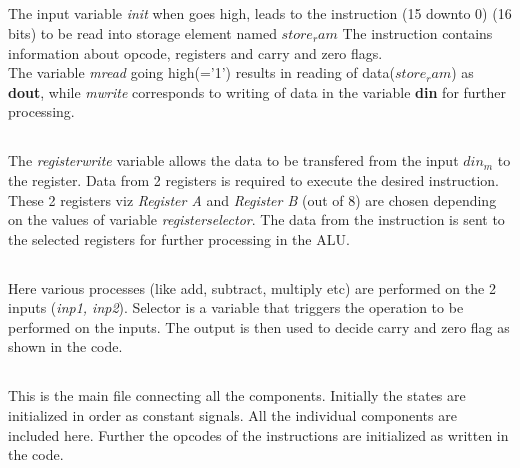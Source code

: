 \documentclass[10pt]{article}
\begin{document}
\subsection{\textbf{\color{blue}{Memory/RAM}}}
The input variable \textit{init} when goes high, leads to the instruction (15 downto 0) (16 bits) to be read into storage element named $ store_ram $
The instruction contains information about opcode, registers and carry and zero flags.
\\ The variable \textit{mread} going high(='1') results in reading of data($ store_ram $) as \textbf{dout}, while \textit{mwrite} corresponds to writing of data in the variable \textbf{din} for further processing.

\subsection{\textbf{\color{blue}{Register File}}}
The \textit{registerwrite} variable allows the data to be transfered from the input $ din_m $ to the register. Data from 2 registers is required to execute the desired instruction. These 2 registers viz \textit{Register A} and \textit{Register B} (out of 8) are chosen depending on the values of variable \textit{registerselector}. The data from the instruction is sent to the selected registers for further processing in the ALU.

\subsection{\textbf{\color{blue}{ALU}}}
Here various processes (like add, subtract, multiply etc) are performed on the 2 inputs (\textit{inp1, inp2}).
Selector is a variable that triggers the operation to be performed on the inputs.
The output is then used to decide carry and zero flag as shown in the code.

\subsection{\textbf{\color{blue}{RISC}}}
This is the main file connecting all the components.
Initially the states are initialized in order as constant signals. All the individual components are included here. Further the opcodes of the instructions are initialized as written in the code.

\subsection{\textbf{\color{blue}{Sequencer}}}
\end{document}
